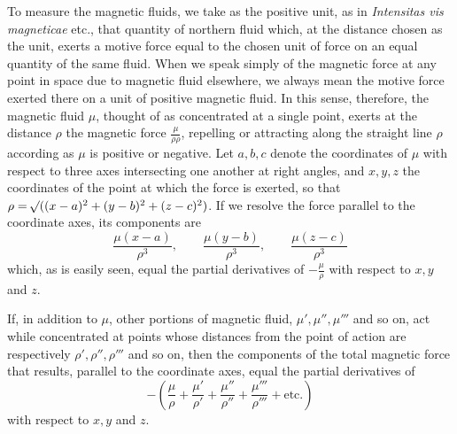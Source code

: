 To measure the magnetic fluids, we take as the positive unit, as in \textit{Intensitas vis magneticae} etc., that quantity of northern fluid which, at the distance chosen as the unit, exerts a motive force equal to the chosen unit of force on an equal quantity of the same fluid. When we speak simply of the magnetic force at any point in space due to magnetic fluid elsewhere, we always mean the motive force exerted there on a unit of positive magnetic fluid. In this sense, therefore, the magnetic fluid $\mu$, thought of as concentrated at a single point, exerts at the distance $\rho$ the magnetic force $\frac{\mu}{\rho\rho}$, repelling or attracting along the straight line $\rho$ according as $\mu$ is positive or negative. Let $a,b,c$ denote the coordinates of $\mu$ with respect to three axes intersecting one another at right angles, and $x,y,z$ the coordinates of the point at which the force is exerted, so that $\rho=\mathord{{}^{}\!\surd}((x-a)^2+(y-b)^2+(z-c)^2)$. If we resolve the force parallel to the coordinate axes, its components are
\[
\frac{\mu(x-a)}{\rho^3},\qquad \frac{\mu(y-b)}{\rho^3},\qquad \frac{\mu(z-c)}{\rho^3}
\]
which, as is easily seen, equal the partial derivatives of $-\frac{\mu}{\rho}$ with respect to $x,y$ and $z$.

If, in addition to $\mu$, other portions of magnetic fluid, $\mu',\mu'',\mu'''$ and so on, act while concentrated at points whose distances from the point of action are respectively $\rho',\rho'',\rho'''$ and so on, then the components of the total magnetic force that results, parallel to the coordinate axes, equal the partial derivatives of
\[
-\left(\frac{\mu}{\rho}+\frac{\mu'}{\rho'}+\frac{\mu''}{\rho''}+\frac{\mu'''}{\rho'''}+\text{etc.}\right)
\]
with respect to $x,y$ and $z$.


